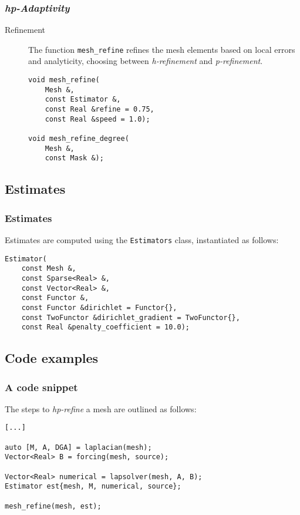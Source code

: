 \begin{frame}[fragile]
    \frametitle{\textit{hp-Adaptivity}}

    \begin{description}
        \item[Refinement] The function \lstinline{mesh_refine} refines the mesh elements based on local errors and analyticity, choosing between \textit{h-refinement} and \textit{p-refinement}.

\begin{lstlisting}[style=cpp]
void mesh_refine(
    Mesh &, 
    const Estimator &, 
    const Real &refine = 0.75, 
    const Real &speed = 1.0);

void mesh_refine_degree(
    Mesh &, 
    const Mask &);
\end{lstlisting}
    \end{description}

\end{frame}

\subsection{Estimates}

\begin{frame}[fragile]
    \frametitle{Estimates}

    Estimates are computed using the \lstinline{Estimators} class, instantiated as follows:

\begin{lstlisting}[style=cpp]
Estimator(
    const Mesh &, 
    const Sparse<Real> &, 
    const Vector<Real> &, 
    const Functor &, 
    const Functor &dirichlet = Functor{}, 
    const TwoFunctor &dirichlet_gradient = TwoFunctor{}, 
    const Real &penalty_coefficient = 10.0);
\end{lstlisting}

\end{frame}

\subsection{Code examples}

\begin{frame}[fragile]
    \frametitle{A code snippet}

    The steps to \textit{hp-refine} a mesh are outlined as follows:

\begin{lstlisting}[style=cpp]
[...]

auto [M, A, DGA] = laplacian(mesh);
Vector<Real> B = forcing(mesh, source);

Vector<Real> numerical = lapsolver(mesh, A, B);
Estimator est{mesh, M, numerical, source};

mesh_refine(mesh, est);
\end{lstlisting}

\end{frame}